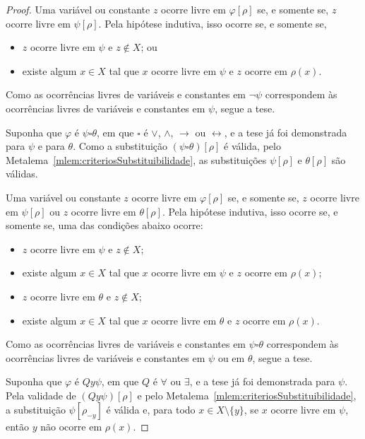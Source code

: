 \begin{proof}
    Uma variável ou constante $z$ ocorre livre em $\varphi[\rho]$ se, e somente se, $z$ ocorre livre em $\psi[\rho]$.
    Pela hipótese indutiva, isso ocorre se, e somente se,
    \begin{itemize}
        \item $z$ ocorre livre em $\psi$ e $z\notin X$; ou
        \item existe algum $x\in X$ tal que $x$ ocorre livre em $\psi$ e $z$ ocorre em $\rho(x)$.
    \end{itemize}
    Como as ocorrências livres de variáveis e constantes em $\neg \psi$ correspondem às ocorrências livres de variáveis e constantes em $\psi$, segue a tese.
    \smallskip

    Suponha que $\varphi$ é $\psi \square \theta$, em que $\square$ é $\vee$, $\wedge$, $\rightarrow$ ou $\leftrightarrow$, e a tese já foi demonstrada para $\psi$ e para $\theta$.
    Como a substituição $(\psi\square\theta)[\rho]$ é válida, pelo Metalema~\ref{mlem:criteriosSubstituibilidade}, as substituições $\psi[\rho]$ e $\theta[\rho]$ são válidas.

    Uma variável ou constante $z$ ocorre livre em $\varphi[\rho]$ se, e somente se, $z$ ocorre livre em $\psi[\rho]$ ou $z$ ocorre livre em $\theta[\rho]$.
    Pela hipótese indutiva, isso ocorre se, e somente se, uma das condições abaixo ocorre:
    \begin{itemize}
        \item $z$ ocorre livre em $\psi$ e $z\notin X$;
        \item existe algum $x\in X$ tal que $x$ ocorre livre em $\psi$ e $z$ ocorre em $\rho(x)$;
        \item $z$ ocorre livre em $\theta$ e $z\notin X$;
        \item existe algum $x\in X$ tal que $x$ ocorre livre em $\theta$ e $z$ ocorre em $\rho(x)$.
    \end{itemize}
    Como as ocorrências livres de variáveis e constantes em $\psi \square \theta$ correspondem às ocorrências livres de variáveis e constantes em $\psi$ ou em $\theta$, segue a tese.
    \smallskip

    Suponha que $\varphi$ é $Qy\psi$, em que $Q$ é $\forall$ ou $\exists$, e a tese já foi demonstrada para $\psi$.
    Pela validade de $(Qy\psi)[\rho]$ e pelo Metalema~\ref{mlem:criteriosSubstituibilidade}, a substituição $\psi[\rho_{-y}]$ é válida e, para todo $x\in X\setminus\{y\}$, se $x$ ocorre livre em $\psi$, então $y$ não ocorre em $\rho(x)$.


\end{proof}

